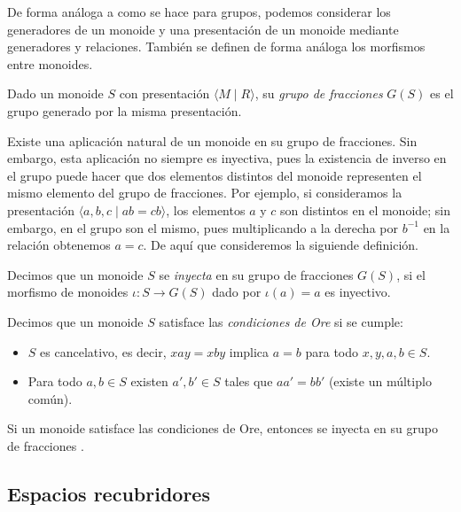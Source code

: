 \documentclass[TFG.tex]{subfiles}
\begin{document}
De forma análoga a como se hace para grupos, podemos considerar los generadores de un monoide y una presentación de un monoide mediante generadores y relaciones. También se definen de forma análoga los morfismos entre monoides. 

\begin{defi}
Dado un monoide $S$ con presentación $\langle M\mid R\rangle$, su \emph{grupo de fracciones} $G(S)$ es el grupo generado por la misma presentación.
\end{defi}

Existe una aplicación natural de un monoide en su grupo de fracciones. Sin embargo, esta aplicación no siempre es inyectiva, pues la existencia de inverso en el grupo puede hacer que dos elementos distintos del monoide representen el mismo elemento del grupo de fracciones. Por ejemplo, si consideramos la presentación $\langle a,b,c\mid ab=cb\rangle$, los elementos $a$ y $c$ son distintos en el monoide; sin embargo, en el grupo son el mismo, pues multiplicando a la derecha por $b^{-1}$ en la relación obtenemos $a=c$. De aquí que consideremos la siguiende definición.

\begin{defi}
Decimos que un monoide $S$ se \emph{inyecta} en su grupo de fracciones $G(S)$, si el morfismo de monoides $\iota: S\to G(S)$ dado por $\iota(a)=a$ es inyectivo.
\end{defi}
\newpage
\begin{defi}\label{condiciones}
Decimos que un monoide $S$ satisface las \emph{condiciones de Ore} \cite{Ore} si se cumple:
\begin{itemize}
\item $S$ es cancelativo, es decir, $xay=xby$ implica $a=b$ para todo $x,y,a,b\in S$. 
\item Para todo $a,b\in S$ existen $a',b'\in S$ tales que $aa'=bb'$ (existe un múltiplo común). 
\end{itemize}
\end{defi}

\begin{prop}
Si un monoide satisface las condiciones de Ore, entonces se inyecta en su grupo de fracciones \cite[Teorema 1.23]{Clifford}.
\end{prop}



\subsection{Espacios recubridores}
\end{document}
